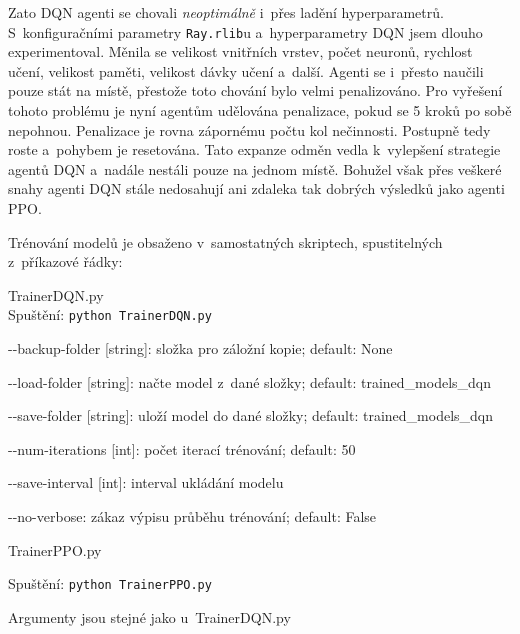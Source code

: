 Zato DQN agenti se chovali \emph{neoptimálně} i~přes ladění hyperparametrů.
S~konfiguračními parametry \texttt{Ray.rlib}u a~hyperparametry DQN jsem dlouho experimentoval.
Měnila se velikost vnitřních vrstev, počet neuronů, rychlost učení, velikost paměti, velikost dávky učení a~další.
Agenti se i~přesto naučili pouze stát na místě, přestože toto chování bylo velmi penalizováno.
Pro vyřešení tohoto problému je nyní agentům udělována penalizace, pokud se 5 kroků po sobě nepohnou.
Penalizace je rovna zápornému počtu kol nečinnosti.
Postupně tedy roste a~pohybem je resetována.
Tato expanze odměn vedla k~vylepšení strategie agentů DQN a~nadále nestáli pouze na jednom místě.
Bohužel však přes veškeré snahy agenti DQN stále nedosahují ani zdaleka tak dobrých výsledků jako agenti PPO\@.

Trénování modelů je obsaženo v~samostatných skriptech, spustitelných z~příkazové řádky:
\begin{myitemize}
  \item TrainerDQN.py\\
  Spuštění: \texttt{python TrainerDQN.py}
  \begin{myitemize}[${}$]
    \item -{}-backup-folder [string]: složka pro záložní kopie; default: None
    \item -{}-load-folder [string]: načte model z~dané složky; default: trained\_models\_dqn
    \item -{}-save-folder [string]: uloží model do dané složky; default: trained\_models\_dqn
    \item -{}-num-iterations [int]: počet iterací trénování; default: 50
    \item -{}-save-interval [int]: interval ukládání modelu
    \item -{}-no-verbose: zákaz výpisu průběhu trénování; default: False
  \end{myitemize}
  \item TrainerPPO.py
  \item Spuštění: \texttt{python TrainerPPO.py}
  \begin{myitemize}
  \item Argumenty jsou stejné jako u~TrainerDQN.py
  \end{myitemize}
\end{myitemize}

